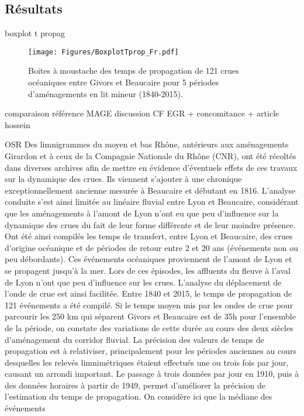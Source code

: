 \documentclass[11pt]{article}
\begin{document}
	\subsection{Résultats}
	boxplot t propag

	\begin{figure}[h]
	\centering
		\texttt{[image: Figures/BoxplotTprop\_Fr.pdf]}
        \caption{Boites à moustache des temps de propagation de 121 crues océaniques entre Givors et Beaucaire pour 5 périodes d'aménagements en lit mineur (1840-2015).}
		\label{fig:BoxplotPropag}
	\end{figure}	
	
	comparaison référence MAGE
	discussion CF EGR + concomitance + article hossein

OSR
Des limnigrammes du moyen et bas Rhône, antérieurs aux aménagements
Girardon et à ceux de la Compagnie Nationale
du Rhône (CNR), ont été récoltés dans
diverses archives afin de mettre en évidence
d’éventuels effets de ces travaux
sur la dynamique des crues. Ils viennent
s’ajouter à une chronique exceptionnellement
ancienne mesurée à Beaucaire et
débutant en 1816. L’analyse conduite s’est
ainsi limitée au linéaire fluvial entre Lyon
et Beaucaire, considérant que les aménagements
à l’amont de Lyon n’ont eu que
peu d’influence sur la dynamique des
crues du fait de leur forme différente et
de leur moindre présence.
Ont été ainsi compilés les temps de transfert,
entre Lyon et Beaucaire, des crues
d’origine océanique et de périodes de
retour entre 2 et 20 ans (événements
non ou peu débordants). Ces événements
océaniques proviennent de l’amont de
Lyon et se propagent jusqu’à la mer. Lors
de ces épisodes, les affluents du fleuve à
l’aval de Lyon n’ont que peu d’influence
sur les crues. L’analyse du déplacement
de l’onde de crue est ainsi facilitée.
Entre 1840 et 2015, le temps de propagation
de 121 événements a été compilé.
Si le temps moyen mis par les ondes
de crue pour parcourir les 250 km qui
séparent Givors et Beaucaire est de 35h
pour l’ensemble de la période, on constate
des variations de cette durée au cours des
deux siècles d’aménagement du corridor
fluvial. La précision des valeurs de temps
de propagation est à relativiser, principalement
pour les périodes anciennes
au cours desquelles les relevés limnimétriques
étaient effectués une ou trois fois
par jour, causant un arrondi important.
Le passage à trois données par jour en
1910, puis à des données horaires à partir
de 1949, permet d’améliorer la précision
de l’estimation du temps de propagation.
On considère ici que la médiane des événements
\end{document}
